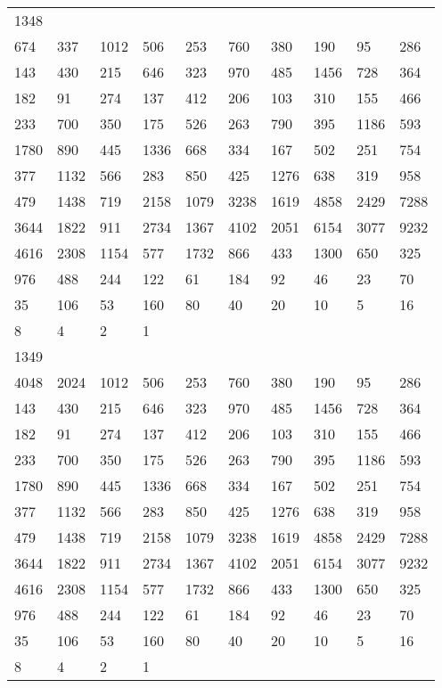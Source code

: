 \begin{longtable}{*{10}{l}}
1348&&&&&&&&&\\
674& 337& 1012& 506& 253& 760& 380& 190& 95& 286\\
143& 430& 215& 646& 323& 970& 485& 1456& 728& 364\\
182& 91& 274& 137& 412& 206& 103& 310& 155& 466\\
233& 700& 350& 175& 526& 263& 790& 395& 1186& 593\\
1780& 890& 445& 1336& 668& 334& 167& 502& 251& 754\\
377& 1132& 566& 283& 850& 425& 1276& 638& 319& 958\\
479& 1438& 719& 2158& 1079& 3238& 1619& 4858& 2429& 7288\\
3644& 1822& 911& 2734& 1367& 4102& 2051& 6154& 3077& 9232\\
4616& 2308& 1154& 577& 1732& 866& 433& 1300& 650& 325\\
976& 488& 244& 122& 61& 184& 92& 46& 23& 70\\
35& 106& 53& 160& 80& 40& 20& 10& 5& 16\\
8& 4& 2& 1& \\

1349&&&&&&&&&\\
4048& 2024& 1012& 506& 253& 760& 380& 190& 95& 286\\
143& 430& 215& 646& 323& 970& 485& 1456& 728& 364\\
182& 91& 274& 137& 412& 206& 103& 310& 155& 466\\
233& 700& 350& 175& 526& 263& 790& 395& 1186& 593\\
1780& 890& 445& 1336& 668& 334& 167& 502& 251& 754\\
377& 1132& 566& 283& 850& 425& 1276& 638& 319& 958\\
479& 1438& 719& 2158& 1079& 3238& 1619& 4858& 2429& 7288\\
3644& 1822& 911& 2734& 1367& 4102& 2051& 6154& 3077& 9232\\
4616& 2308& 1154& 577& 1732& 866& 433& 1300& 650& 325\\
976& 488& 244& 122& 61& 184& 92& 46& 23& 70\\
35& 106& 53& 160& 80& 40& 20& 10& 5& 16\\
8& 4& 2& 1& \\


\end{longtable}
